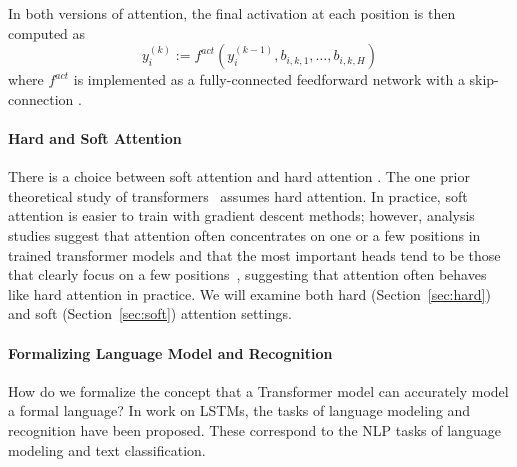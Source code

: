 \documentclass[11pt,a4paper]{article}
\begin{document}
In both versions of attention, the final activation at each position is then computed as
\begin{equation}
    y_i^{(k)} := f^{act}(y_i^{(k-1)}, b_{i,k,1}, \dots, b_{i,k,H})
\end{equation}
where $f^{act}$ is implemented as a fully-connected feedforward network with a skip-connection \cite{vaswani2017attention}.

\paragraph{Hard and Soft Attention}
There is a choice between soft attention and hard attention \cite{shen2018reinforced,perez2019turing}.
The one prior theoretical study of transformers~\cite{perez2019turing} assumes hard attention.
In practice, soft attention is easier to train with gradient descent methods; however, analysis studies suggest that attention often concentrates on one or a few positions in trained transformer models \cite{voita2019analyzing,clark2019bert} and that the most important heads tend to be those that clearly focus on a few positions~\cite{voita2019analyzing}, suggesting that attention often behaves  like hard attention in practice. %
We will  examine both hard (Section~\ref{sec:hard}) and soft (Section~\ref{sec:soft}) attention settings.


\paragraph{Formalizing Language Model and Recognition}
How do we formalize the concept that a Transformer model can accurately model a formal language?
In work on LSTMs, the tasks of language modeling \citep{skachkova2018closing} and recognition \citep{weiss2018practical} have been proposed.
These correspond to the NLP tasks of language modeling and text classification.
\end{document}
